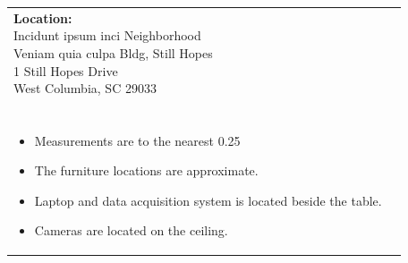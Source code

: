 \documentclass[12pt]{article}
\begin{document}
    \vspace*{\fill}  %
    \begin{table}[H]
	\begin{tabular}{l l}
		\makecell[lt]{
			\textbf{Location:}\\
     		Incidunt ipsum inci Neighborhood \\
 		    Veniam quia culpa  Bldg, Still Hopes\\
           	1 Still Hopes Drive\\
           	West Columbia, SC 29033\\\\
        }   	
        &	
		\makecell[tp{5in}]{
		\textbf{Notes:}\\
		\vspace{-8mm}  %
		\begin{itemize}
			\setlength\itemsep{-3mm}  %
			\item Measurements are to the nearest \SI{0.25}{\inch}
			\item The furniture locations are approximate.
			\item Laptop and data acquisition system is located beside the table.
			\item Cameras are located on the ceiling.
		\end{itemize}
		}	
			
	\end{tabular}
	\vspace{-8mm} %
\end{table}

    
\end{document}
